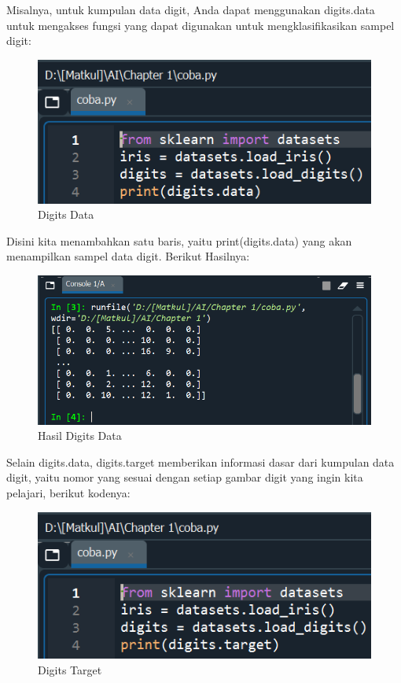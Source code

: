 \par Misalnya, untuk kumpulan data digit, Anda dapat menggunakan digits.data untuk mengakses fungsi yang dapat digunakan untuk mengklasifikasikan sampel digit:
    \begin{figure}[H]
    \centering
    \includegraphics[width=12cm]{figures/chapter1/4.PNG}
    \caption{Digits Data}
    \end{figure}

\par Disini kita menambahkan satu baris, yaitu print(digits.data) yang akan menampilkan sampel data digit. Berikut Hasilnya:
    \begin{figure}[H]
    \centering
    \includegraphics[width=13cm]{figures/chapter1/5.PNG}
    \caption{Hasil Digits Data}
    \end{figure}
    
\par Selain digits.data, digits.target memberikan informasi dasar dari kumpulan data digit, yaitu nomor yang sesuai dengan setiap gambar digit yang ingin kita pelajari, berikut kodenya:
    \begin{figure}[H]
    \centering
    \includegraphics[width=13cm]{figures/chapter1/6.PNG}
    \caption{Digits Target}
    \end{figure}

